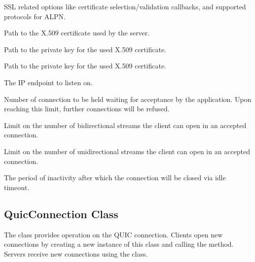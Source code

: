 \begin{description}

        SSL related options like certificate selection/validation callbacks, and supported protocols for ALPN\@.

     Path to the X.509 certificate used by the server.

     Path to the private key for the used X.509 certificate.

     Path to the private key for the used X.509 certificate.

     The IP endpoint to listen on.

     Number of connection to be held waiting for acceptance by the application. Upon reaching this limit, further connections will be refused.

     Limit on the number of bidirectional streams the client can open in an accepted connection.

     Limit on the number of unidirectional streams the client can open in an accepted connection.

     The period of inactivity after which the connection will be closed via idle timeout.

\end{description}

\subsection{QuicConnection Class}

The \QuicConnection{} class provides operation on the QUIC connection. Clients open new
connections by creating a new instance of this class and calling the  method.
Servers receive new connections using the  class.

